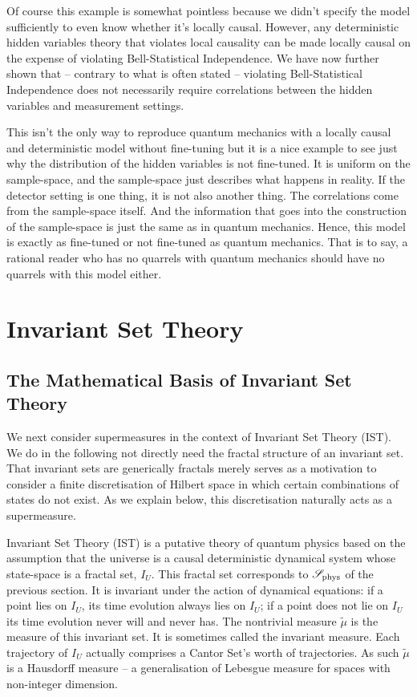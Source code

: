 \documentclass{article}
\begin{document}
Of course this example is somewhat pointless because we didn't specify the model sufficiently to even know whether it's locally causal. However, any deterministic hidden variables theory that violates local causality can be made locally causal on the expense of violating Bell-Statistical Independence. We have now further shown that -- contrary to what is often stated -- violating Bell-Statistical Independence does not necessarily require correlations between the hidden variables and measurement settings.

This isn't the only way to reproduce quantum mechanics with a locally causal and deterministic model without fine-tuning \cite{Donadi2020SuperdetToy} but it is a nice example to see just why the distribution of the hidden variables is not fine-tuned. It is uniform on the sample-space, and the sample-space just describes what happens in reality. If the detector setting is one thing, it is not also another thing. The correlations come from the sample-space itself. And the information that goes into the construction of the sample-space is just the same as in quantum mechanics. Hence, this model is exactly as fine-tuned or not fine-tuned as quantum mechanics. That is to say, a rational reader who has no quarrels with quantum mechanics should have no quarrels with this model either.


\section{Invariant Set Theory}
\label{IST}


\subsection{The Mathematical Basis of Invariant Set Theory}
\label{istmath}

We next consider supermeasures in the context of Invariant Set Theory ({\sc IST}). We do in the following not directly need the fractal structure of an invariant set. That invariant sets are generically fractals merely serves as a motivation to consider a finite discretisation of Hilbert space in which certain combinations of states do not exist. As we explain below, this discretisation naturally acts as a supermeasure.

Invariant Set Theory ({\sc IST}) \cite{Palmer2020Discretization,Palmer1995Spin,Palmer2009ISP} is a putative theory of quantum physics based on the assumption that the universe is a causal deterministic dynamical system whose state-space is a fractal set, $I_U$. This fractal set corresponds to ${\mathscr S}_{\rm phys}$ of the previous section. It is invariant under the action of dynamical equations: if a point lies on $I_U$, its time evolution always lies on $I_U$; if a point does not lie on $I_U$ its time evolution never will and never has. The nontrivial measure $\tilde \mu$ is the measure of this invariant set. It is sometimes called the invariant measure. Each trajectory of $I_U$ actually comprises a Cantor Set's worth of trajectories. As such $\tilde \mu$ is a Hausdorff measure \cite{Rogers1998Hausdorff} -- a generalisation of Lebesgue measure for spaces with non-integer dimension. 
\end{document}
